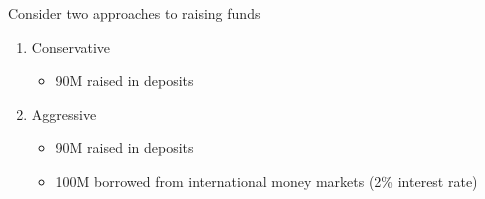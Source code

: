 \documentclass{beamer}
\begin{document}
\begin{frame}
  Consider two approaches to raising funds  
\begin{enumerate}
  \item Conservative 
  \begin{itemize}
    \item  90M raised in deposits
  \end{itemize} 
 \item Aggressive 
  \begin{itemize}
    \item 90M raised in deposits
    \item 100M borrowed from international money markets (2\% interest rate)
  \end{itemize}
\end{enumerate}
\end{frame}
\end{document}
